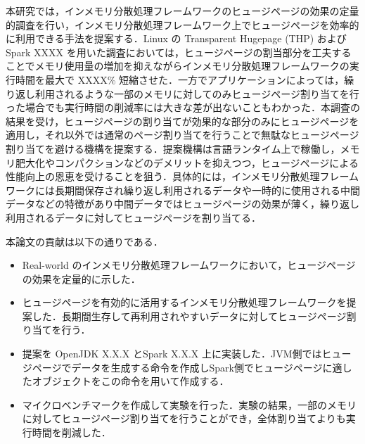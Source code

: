 本研究では，インメモリ分散処理フレームワークのヒュージページの効果の定量的調査を行い，インメモリ分散処理フレームワーク上でヒュージページを効率的に利用できる手法を提案する．Linux の Transparent Hugepage (THP) および Spark XXXX を用いた調査においては，ヒュージページの割当部分を工夫することでメモリ使用量の増加を抑えながらインメモリ分散処理フレームワークの実行時間を最大で XXXX\% 短縮させた．一方でアプリケーションによっては，繰り返し利用されるような一部のメモリに対してのみヒュージページ割り当てを行った場合でも実行時間の削減率には大きな差が出ないこともわかった．本調査の結果を受け，ヒュージページの割り当てが効果的な部分のみにヒュージページを適用し，それ以外では通常のページ割り当てを行うことで無駄なヒュージページ割り当てを避ける機構を提案する．提案機構は言語ランタイム上で稼働し，メモリ肥大化やコンパクションなどのデメリットを抑えつつ，ヒュージページによる性能向上の恩恵を受けることを狙う．具体的には，インメモリ分散処理フレームワークには長期間保存され繰り返し利用されるデータや一時的に使用される中間データなどの特徴があり中間データではヒュージページの効果が薄く，繰り返し利用されるデータに対してヒュージページを割り当てる．

本論文の貢献は以下の通りである．
\begin{itemize}
  \item Real-world のインメモリ分散処理フレームワークにおいて，ヒュージページの効果を定量的に示した．
  \item ヒュージページを有効的に活用するインメモリ分散処理フレームワークを提案した．長期間生存して再利用されやすいデータに対してヒュージページ割り当てを行う．
  \item 提案を OpenJDK X.X.X とSpark X.X.X 上に実装した．JVM側ではヒュージページでデータを生成する命令を作成しSpark側でヒュージページに適したオブジェクトをこの命令を用いて作成する．
  \item マイクロベンチマークを作成して実験を行った．実験の結果，一部のメモリに対してヒュージページ割り当てを行うことができ，全体割り当てよりも実行時間を削減した．
\end{itemize}
